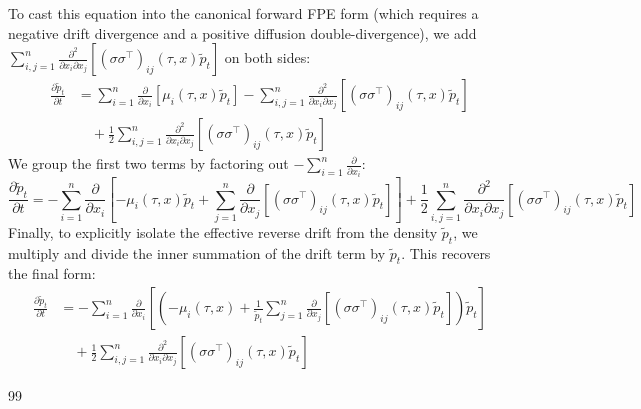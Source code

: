 \documentclass[11pt]{amsart}
\theoremstyle{plain}
\theoremstyle{definition}
\theoremstyle{remark}
\numberwithin{equation}{section}
\begin{document}
{To cast this equation into the canonical forward FPE form (which requires a negative drift divergence and a positive diffusion double-divergence), we add $\sum_{i,j=1}^n \frac{\partial^2}{\partial x_i \partial x_j} [(\sigma\sigma^\top)_{ij}(\tau, x) \tilde{p}_t]$ on both sides:
\begin{equation}
\begin{split}
    \frac{\partial \tilde{p}_t}{\partial t} &= \sum_{i=1}^n \frac{\partial}{\partial x_i} [\mu_i(\tau, x) \tilde{p}_t] - \sum_{i,j=1}^n \frac{\partial^2}{\partial x_i \partial x_j} [(\sigma\sigma^\top)_{ij}(\tau, x) \tilde{p}_t] \\
    &\quad + \frac{1}{2} \sum_{i,j=1}^n \frac{\partial^2}{\partial x_i \partial x_j} [(\sigma\sigma^\top)_{ij}(\tau, x) \tilde{p}_t]
\end{split}
\end{equation}
We group the first two terms by factoring out $-\sum_{i=1}^n \frac{\partial}{\partial x_i}$:
\begin{equation}
    \frac{\partial \tilde{p}_t}{\partial t} = -\sum_{i=1}^n \frac{\partial}{\partial x_i} \left[ -\mu_i(\tau, x) \tilde{p}_t + \sum_{j=1}^n \frac{\partial}{\partial x_j} [(\sigma\sigma^\top)_{ij}(\tau, x) \tilde{p}_t] \right] + \frac{1}{2} \sum_{i,j=1}^n \frac{\partial^2}{\partial x_i \partial x_j} [(\sigma\sigma^\top)_{ij}(\tau, x) \tilde{p}_t]
\end{equation}
Finally, to explicitly isolate the effective reverse drift from the density $\tilde{p}_t$, we multiply and divide the inner summation of the drift term by $\tilde{p}_t$. This recovers the final form:
\begin{equation}
\begin{split}
    \frac{\partial \tilde{p}_t}{\partial t} &= -\sum_{i=1}^n \frac{\partial}{\partial x_i} \left[ \left( -\mu_i(\tau, x) + \frac{1}{\tilde{p}_t} \sum_{j=1}^n \frac{\partial}{\partial x_j} [(\sigma\sigma^\top)_{ij}(\tau, x) \tilde{p}_t] \right) \tilde{p}_t \right] \\
    &\quad + \frac{1}{2} \sum_{i,j=1}^n \frac{\partial^2}{\partial x_i \partial x_j} [(\sigma\sigma^\top)_{ij}(\tau, x) \tilde{p}_t]
\end{split}
\end{equation}



\begin{thebibliography}{99}


\end{thebibliography}}
\end{document}
